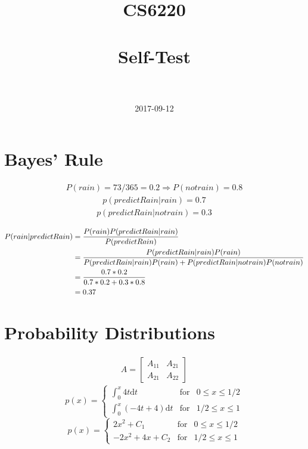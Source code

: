 \documentclass[paper=a4, fontsize=11pt]{scrartcl} %
\title{	
\normalfont \normalsize 
\textsc{CS6220} \\ [25pt] %
\horrule{0.5pt} \\[0.4cm] %
\huge Self-Test \\ %
\horrule{2pt} \\[0.5cm] %
}
\author{} %
\date{\normalsize2017-09-12} %
\begin{document}
\maketitle %


\section{Bayes' Rule}

\begin{align*} 
P(rain) = 73/365 = 0.2
\Rightarrow
P(not rain) = 0.8
\end{align*}
\begin{align*} 
p(predictRain|rain) = 0.7
\end{align*}
\begin{align*}
p(predictRain|not rain) = 0.3
\end{align*}

\[
\begin{split} 
P(rain|predictRain)
  &= \dfrac{P(rain)P(predictRain|rain)}{P(predictRain)}
  \\
  &= \dfrac{P(predictRain|rain)P(rain)}{P(predictRain|rain)P(rain) + P(predictRain|not\space rain)P(not\space rain)}
  \\
  &=  \dfrac{0.7*0.2}{0.7*0.2 + 0.3*0.8}
  \\
   &=  0.37
\end{split}
\]


\section{Probability Distributions}

\begin{align*}
A = 
\begin{bmatrix}
A_{11} & A_{21} \\
A_{21} & A_{22}
\end{bmatrix}
\end{align*}
\begin{equation*}\label{SplitFunc}
p(x) = \left\{
	\begin{array}{rcl}
       \int_{0}^{x} 4t \mathrm{d}t & \mbox{for} & 0\leq x \leq1/2 \\
       \int_{0}^{x} (-4t+4) \mathrm{d}t & \mbox{for} & 1/2\leq x \leq1
  	\end{array}\right.
\end{equation*}
\begin{equation*}\label{SplitFunc}
p(x) = \left\{
	\begin{array}{rcl}
       2x^{2}+C_1 & \mbox{for} & 0\leq x \leq1/2 \\
      -2x^{2} + 4x+C_2 & \mbox{for} & 1/2\leq x \leq1
  	\end{array}\right.
\end{equation*}
\end{document}
